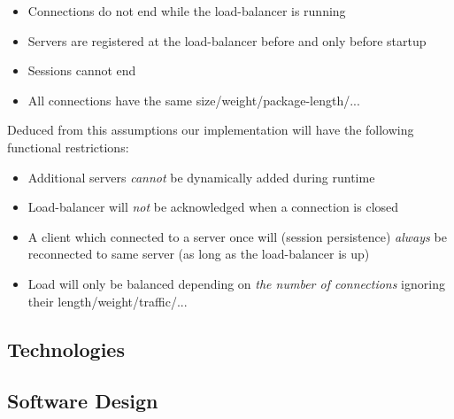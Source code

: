 \documentclass[11pt, a4paper]{article}
\begin{document}
\vspace{-10pt}
\begin{itemize}
	\item Connections do not end while the load-balancer is running
	\item Servers are registered at the load-balancer before and only before startup
	\item Sessions cannot end
	\item All connections have the same size/weight/package-length/...
\end{itemize}
\vspace{-10pt}

Deduced from this assumptions our implementation will have the following functional restrictions:

\vspace{-10pt}
\begin{itemize}
	\item Additional servers \textit{cannot} be dynamically added during runtime
	\item Load-balancer will \textit{not} be acknowledged when a connection is closed
	\item A client which connected to a server once will (session persistence) \textit{always} be reconnected to same server (as long as the load-balancer is up)
	\item Load will only be balanced depending on \textit{the number of connections} ignoring their length/weight/traffic/...
\end{itemize}
\vspace{-10pt}

\subsection{Technologies}

\subsection{Software Design}

\nocite{*}


\end{document}
